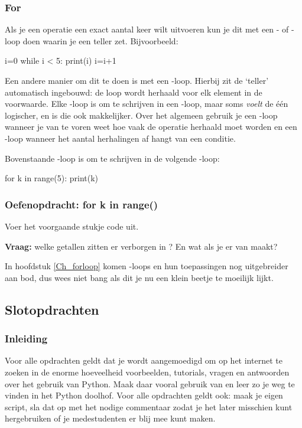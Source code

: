 \documentclass[a4paper,11pt, fleqn]{article}
\begin{document}
\subsubsection{For}
Als je een operatie een exact aantal keer wilt uitvoeren kun je dit met een - of -loop doen waarin je een teller zet. Bijvoorbeeld:
\begin{python}
i=0
while i < 5:
    print(i)
    i=i+1
\end{python}
Een andere manier om dit te doen is met een -loop. Hierbij zit de `teller' automatisch ingebouwd: de loop wordt herhaald voor elk element in de voorwaarde. Elke -loop is om te schrijven in een -loop, maar soms \textit{voelt} de \'e\'en logischer, en is die ook makkelijker. Over het algemeen gebruik je een -loop wanneer je van te voren weet hoe vaak de operatie herhaald moet worden en een -loop wanneer het aantal herhalingen af hangt van een conditie.

Bovenstaande -loop is om te schrijven in de volgende -loop:
\begin{python}
for k in range(5):
    print(k)
\end{python}

\subsubsection*{Oefenopdracht: for k in range()}
Voer het voorgaande stukje code uit. 

\textbf{Vraag:} welke getallen zitten er verborgen in ? En wat als je er  van maakt?

In hoofdstuk \ref{Ch_forloop} komen -loops en hun toepassingen nog uitgebreider aan bod, dus wees niet bang als dit je nu een klein beetje te moeilijk lijkt.

\subsection{Slotopdrachten}

\subsubsection{Inleiding}
Voor alle opdrachten geldt dat je wordt aangemoedigd om op het internet te zoeken in de enorme hoeveelheid voorbeelden, tutorials, vragen en antwoorden over het gebruik van Python. Maak daar vooral gebruik van en leer zo je weg te vinden in het Python doolhof. 
Voor alle opdrachten geldt ook: maak je eigen script, sla dat op met het nodige commentaar zodat je het later misschien kunt hergebruiken of je medestudenten er blij mee kunt maken.
\end{document}
